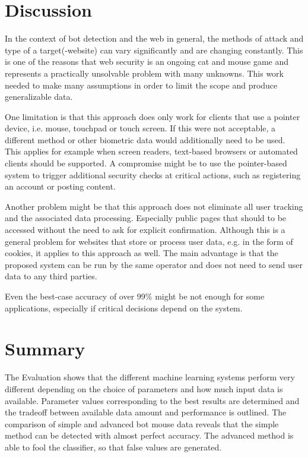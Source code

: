 \documentclass[
    fontsize=12pt,
    headings=small,
    parskip=half,           %
    bibliography=totoc,
    numbers=noenddot,       %
    open=any,               %
    final,                   %
    table
]{scrreprt}
\begin{document}
\section{Discussion}

In the context of bot detection and the web in general, the methods of attack and type of a target(-website) can vary significantly and are changing constantly. This is one of the reasons that web security is an ongoing cat and mouse game and represents a practically unsolvable problem with many unknowns. This work needed to make many assumptions in order to limit the scope and produce generalizable data.

One limitation is that this approach does only work for clients that use a pointer device, i.e. mouse, touchpad or touch screen. If this were not acceptable, a different method or other biometric data would additionally need to be used. This applies for example when screen readers, text-based browsers or automated clients should be supported. A compromise might be to use the pointer-based system to trigger additional security checks at critical actions, such as registering an account or posting content.

Another problem might be that this approach does not eliminate all user tracking and the associated data processing. Especially public pages that should to be accessed without the need to ask for explicit confirmation. Although this is a general problem for websites that store or process user data, e.g. in the form of cookies, it applies to this approach as well. The main advantage is that the proposed system can be run by the same operator and does not need to send user data to any third parties.

Even the best-case accuracy of over 99\% might be not enough for some applications, especially if critical decisions depend on the system.

\section{Summary}

The Evaluation shows that the different machine learning systems perform very different depending on the choice of parameters and how much input data is available. Parameter values corresponding to the best results are determined and the tradeoff between available data amount and performance is outlined. The comparison of simple and advanced bot mouse data reveals that the simple method can be detected with almost perfect accuracy. The advanced method is able to fool the classifier, so that false values are generated.
\end{document}
